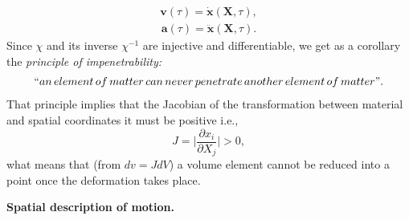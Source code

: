 \documentclass[12pt]{article}
\begin{document}
\begin{align}
\mathbf{v}(\tau)=\mathbf{\dot{x}}(\mathbf{X},\tau),
\end{align}
\begin{align}
\mathbf{a}(\tau)=\mathbf{\ddot{x}}(\mathbf{X},\tau).
\end{align}
Since $\chi$ and its inverse $\chi^{-1}$ are injective and differentiable, we get as a corollary the {\em principle of impenetrability:}
\begin{align*}
``an\, element\, of\, matter\, can\, never\, penetrate\, another\, element\, of\, matter".
\end{align*}
That principle implies that the Jacobian of the transformation between material and spatial coordinates it must be positive i.e.,
\[J= \bigg|\frac{\partial{x_i}}{\partial{X_j}}\bigg| > 0,\]
what means that (from $dv=JdV$) a volume element cannot be reduced into a point once the deformation takes place.

\textbf{Spatial description of motion.}
\end{document}
